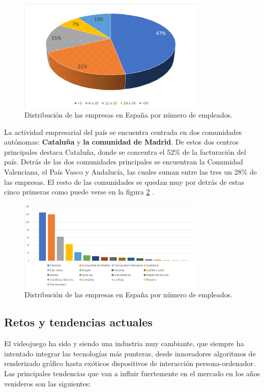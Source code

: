\begin{figure}[h]
    \centering
    \includegraphics[width=0.8\textwidth]{images/estadodelarte/mercado/distribucion-tamano-esp}
    \caption{Distribución de las empresas en España por número de empleados.}
    \label{distribucion-tamano-esp}
\end{figure}

La actividad empresarial del país se encuentra centrada en dos comunidades autónomas: \textbf{Cataluña} y \textbf{la comunidad de Madrid}. De estos dos centros principales destaca Cataluña, donde se concentra el 52\% de la facturación del país. Detrás de las dos comunidades principales se encuentran la Comunidad Valenciana, el País Vasco y Andalucía, las cuales suman entre las tres un 28\% de las empresas. El resto de las comunidades se quedan muy por detrás de estas cinco primeras como puede verse en la figura \ref{distribucion-comunidades-esp} \cite{libro_blanco}.

\begin{figure}[h]
    \centering
    \includegraphics[width=0.8\textwidth]{images/estadodelarte/mercado/distribucion-comunidades-esp}
    \caption{Distribución de las empresas en España por número de empleados.}
    \label{distribucion-comunidades-esp}
\end{figure}

\subsection{Retos y tendencias actuales}
El videojuego ha sido y siendo una industria muy cambiante, que siempre ha intentado integrar las tecnologías más punteras, desde innovadores algoritmos de renderizado gráfico hasta exóticos dispositivos de interacción persona-ordenador. Las principales tendencias que van a influir fuertemente en el mercado en los años venideros son las siguientes:

